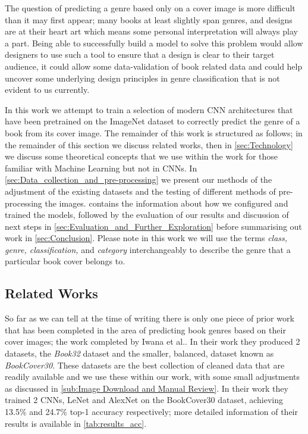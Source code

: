 \documentclass[12pt]{article}
\numberwithin{equation}{section}
\numberwithin{figure}{section}
\begin{document}
The question of predicting a genre based only on a cover image is more difficult than it may first appear; many books at least slightly span genres, and designs are at their heart art which means some personal interpretation will always play a part. Being able to successfully build a model to solve this problem would allow designers to use such a tool to ensure that a design is clear to their target audience, it could allow some data-validation of book related data and could help uncover some underlying design principles in genre classification that is not evident to us currently. 

In this work we attempt to train a selection of modern CNN architectures that have been pretrained on the ImageNet dataset to correctly predict the genre of a book from its cover image. The remainder of this work is structured as follows; in the remainder of this section we discuss related works, then in \cref{sec:Technology} we discuss some theoretical concepts that we use within the work for those familiar with Machine Learning but not in CNNs. In \cref{sec:Data_collection_and_pre-processing} we present our methods of the adjustment of the existing datasets and the testing of different methods of pre-processing the images.  contains the information about how we configured and trained the models, followed by the evaluation of our results and discussion of next steps in \cref{sec:Evaluation_and_Further_Exploration} before summarising out work in \cref{sec:Conclusion}. Please note in this work we will use the terms \emph{class, genre, classification,} and \emph{category} interchangeably to describe the genre that a particular book cover belongs to.

\subsection{Related Works} 
\label{sub:Related Works} 
So far as we can tell at the time of writing there is only one piece of prior work that has been completed in the area of predicting book genres based on their cover images; the work completed by Iwana et al.\cite{KenjiIwana}. In their work they produced 2 datasets, the \emph{Book32} dataset and the smaller, balanced, dataset known as \emph{BookCover30}. These datasets are the best collection of cleaned data that are readily available and we use these within our work, with some small adjustments as discussed in \cref{sub:Image Download and Manual Review}. In their work they trained 2 CNNs, LeNet and AlexNet on the BookCover30 dataset, achieving 13.5\% and 24.7\% top-1 accuracy respectively; more detailed information of their results is available in \cref{tab:results_acc}.
\end{document}
